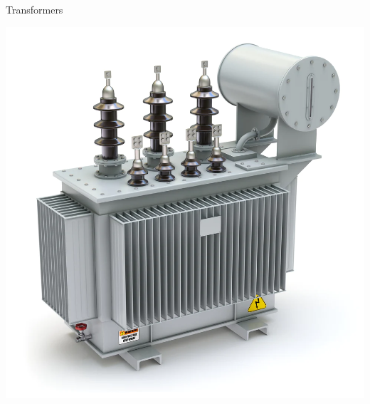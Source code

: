 \documentclass{beamer}
\begin{document}
\begin{frame}[fragile]{Transformers}
    \begin{center}
        \includegraphics[width=\textwidth,height=0.9\textheight,keepaspectratio]{figures/electrical_transformer.png}
    \end{center}
\end{frame}
\end{document}
